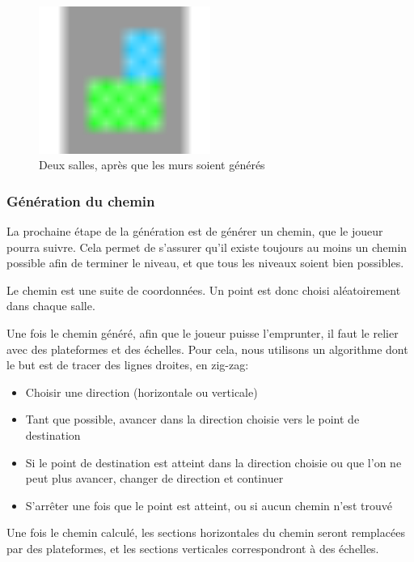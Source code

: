 \documentclass[10pt]{report}
\begin{document}
\begin{figure}[H]
  \centering
  \includegraphics[width=0.5\textwidth]{images/filling_the_world}
  \caption{Deux salles, après que les murs soient générés}
  \label{fig:filling_world}
\end{figure}

\subsubsection{Génération du chemin}

La prochaine étape de la génération est de générer un chemin, que le 
joueur pourra suivre.
Cela permet de s'assurer qu'il existe toujours au
moins un chemin possible afin de terminer le niveau, et que tous les 
niveaux soient bien possibles.

Le chemin est une suite de coordonnées.
Un point est donc choisi aléatoirement dans chaque salle.

Une fois le chemin généré, afin que le joueur puisse l'emprunter, il
faut le relier avec des plateformes et des échelles.
Pour cela, nous utilisons un algorithme dont le but est de tracer des
lignes droites, en zig-zag:

\begin{itemize}
  \item Choisir une direction (horizontale ou verticale)
  \item Tant que possible, avancer dans la direction choisie vers le
  point de destination
  \item Si le point de destination est atteint dans la direction choisie
  ou que l'on ne peut plus avancer, changer de direction et continuer
  \item S'arrêter une fois que le point est atteint, ou si aucun chemin 
  n'est trouvé
\end{itemize}

Une fois le chemin calculé, les sections horizontales du chemin seront
remplacées par des plateformes, et les sections verticales correspondront
à des échelles.
\end{document}
